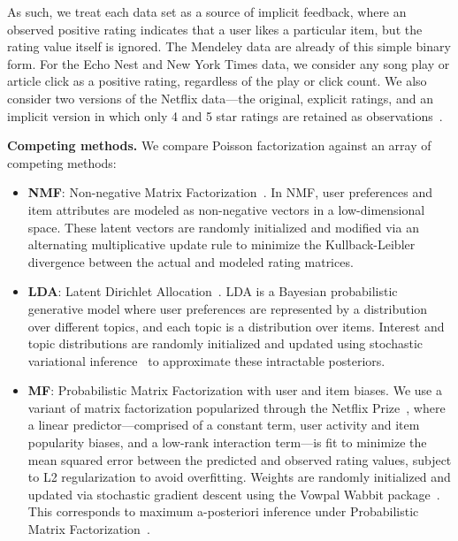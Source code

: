 As such, we treat each data set as a source of implicit feedback,
where an observed positive rating indicates that a user likes a
particular item, but the rating value itself is ignored. The Mendeley
data are already of this simple binary form. For the Echo Nest and New
York Times data, we consider any song play or article click as a
positive rating, regardless of the play or click count. We also
consider two versions of the Netflix data---the original, explicit
ratings, and an implicit version in which only 4 and 5 star ratings
are retained as observations~\cite{Paquet:2013p9197}.


{\bf Competing methods.} We compare Poisson factorization against an array of
competing methods:
\begin{itemize}
  \item {\bf NMF}: Non-negative Matrix
    Factorization~\cite{Lee:1999}. In NMF, user preferences and item
    attributes are modeled as non-negative vectors in a
    low-dimensional space. These latent vectors are randomly
    initialized and modified via an alternating multiplicative update
    rule to minimize the Kullback-Leibler divergence between the
    actual and modeled rating matrices.

  \item {\bf LDA}: Latent Dirichlet Allocation~\cite{Blei:2003b}. LDA
    is a Bayesian probabilistic generative model where user preferences
    are represented by a distribution over different topics, and each
    topic is a distribution over items. Interest and topic
    distributions are randomly initialized and updated using
    stochastic variational inference~\cite{Hoffman:2013} to
    approximate these intractable posteriors.

  \item {\bf MF}: Probabilistic Matrix Factorization with
    user and item biases. We use a variant of matrix factorization
    popularized through the Netflix Prize~\cite{Koren:2009}, where a
    linear predictor---comprised of a constant term, user activity and
    item popularity biases, and a low-rank interaction term---is fit
    to minimize the mean squared error between the predicted and
    observed rating values, subject to L2 regularization to avoid
    overfitting. Weights are randomly initialized and updated via
    stochastic gradient descent using the Vowpal Wabbit
    package~\cite{Weinberger:2009}. This corresponds to maximum
    a-posteriori inference under Probabilistic Matrix
    Factorization~\cite{Salakhutdinov:2008a}.
\end{itemize}

